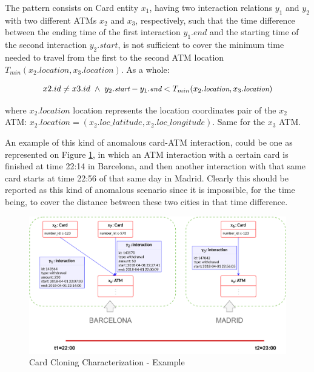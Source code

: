 The pattern consists on Card entity $x_1$, having two interaction relations $y_1$ and $y_2$ with two different ATMs $x_2$ and $x_3$, respectively, such that the time difference between the ending time of the first interaction $y_1.\textit{end}$ and the starting time of the second interaction $y_2.\textit{start}$, is not sufficient to cover the minimum time needed to travel from the first to the second ATM location $T_{min}(x_2.\textit{location}, x_3.\textit{location})$. As a whole:

$$
\small
x2.id \ne x3.id \ \land \ y_2.\textit{start} - y_1.\textit{end} < T_{min}(x_2.\textit{location}, x_3.\textit{location})
$$

where $x_2.\textit{location}$ location represents the location coordinates pair of the $x_2$ ATM: $x_2.location = (x_2.loc\_latitude, x_2.loc\_longitude)$. Same for the $x_3$ ATM.


An example of this kind of anomalous card-ATM interaction, could be one as represented on Figure \ref{img:graphPattern-1-Example}, in which an ATM interaction with a certain card is finished at time 22:14 in Barcelona, and then another interaction with that same card starts at time 22:56 of that same day in Madrid. Clearly this should be reported as this kind of anomalous scenario since it is impossible, for the time being, to cover the distance between these two cities in that time difference.

\begin{figure}[H]
  \centering
  \includegraphics[scale = 0.7]{images/2-QueryModel/FP1-Example.png}
  \caption{Card Cloning Characterization - Example}
  \label{img:graphPattern-1-Example}
\end{figure}

